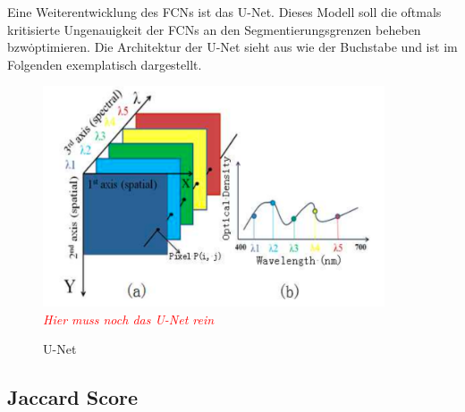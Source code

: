 
Eine Weiterentwicklung des \ac{FCN}s ist das U-Net.
Dieses Modell soll die oftmals kritisierte Ungenauigkeit der \ac{FCN}s an den Segmentierungsgrenzen beheben bzw\.
optimieren.
Die Architektur der U-Net sieht aus wie der Buchstabe \grqq und ist im Folgenden exemplatisch dargestellt.

\begin{figure}[H]
    \caption {U-Net}
    \label{fig:uNet}
    \includegraphics[width=0.9\textwidth]{abbildungen/datacube_spectral.png}
    \\
    \textit{\textcolor{red}{Hier muss noch das U-Net rein}}
    \\
\end{figure}


\subsection{Jaccard Score}

